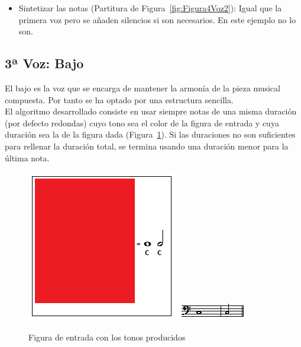 \begin{itemize}
	\item Sintetizar las notas (Partitura de Figura~\ref{fig:Figura4Voz2}): Igual que la primera voz pero se añaden silencios si son necesarios. En este ejemplo no lo son.

\end{itemize}


\subsection{3ª Voz: Bajo}

El bajo es la voz que se encarga de mantener la armonía de la pieza musical compuesta. Por tanto se ha optado por una estructura sencilla. \\

El algoritmo desarrollado consiste en usar siempre notas de una misma duración (por defecto redondas) cuyo tono sea el color de la figura de entrada y cuya duración sea la de la figura dada (Figura~\ref{fig:Figura1Voz3}). Si las duraciones no son suficientes para rellenar la duración total, se termina usando una duración menor para la última nota. \\

		\begin{figure}[!htbp]
		\centering
		\hspace*{0.0in}
		\includegraphics[scale=1]{graphics/simpletest2-F2F3.png}
		\includegraphics[scale=1]{graphics/simpletest2-BASSpartitura.png}
		\caption{Figura de entrada con los tonos producidos}
		\label{fig:Figura1Voz3}
		\end{figure}

